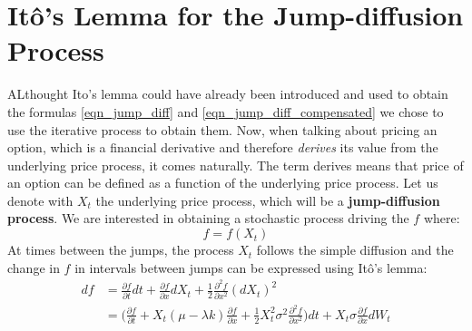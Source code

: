 \documentclass[times, utf8, diplomski]{fer}
\begin{document}
\section{It\^{o}'s Lemma for the Jump-diffusion Process}
ALthought Ito's lemma could have already been introduced and used to obtain the formulas \ref{eqn_jump_diff} and \ref{eqn_jump_diff_compensated} we chose to use the iterative process to obtain them. Now, when talking about pricing an option, which is a financial derivative and therefore \textit{derives} its value from the underlying price process, it comes naturally. The term derives means that price of an option can be defined as a function of the underlying price process. Let us denote with $X_t$ the underlying price process, which will be a \textbf{jump-diffusion process}. We are interested in obtaining a stochastic process driving the $f$ where: $$ f = f(X_t) $$
At times between the jumps, the process $X_t$ follows the simple diffusion and the change in $f$ in intervals between jumps can be expressed using It\^{o}'s lemma: 
\begin{equation} \label{eqn_diff_part}
\begin{split}
	df &= \frac{\partial f}{\partial t}dt + \frac{\partial f}{\partial x}dX_t + \frac{1}{2}\frac{\partial^2f}{\partial x^2}(dX_t)^2 \\
	   &= \bigg(\frac{\partial f}{\partial t} + X_t(\mu - \lambda k)\frac{\partial f}{\partial x} + \frac{1}{2}X_t^2\sigma^2\frac{\partial^2 f}{\partial x^2}\bigg)dt + X_t\sigma\frac{\partial f}{\partial x}dW_t
\end{split}
\end{equation}
\end{document}
